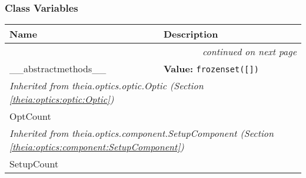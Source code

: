   \subsubsection{Class Variables}

    \vspace{-1cm}
\hspace{\varindent}\begin{longtable}{|p{\varnamewidth}|p{\vardescrwidth}|l}
\cline{1-2}
\cline{1-2} \centering \textbf{Name} & \centering \textbf{Description}& \\
\cline{1-2}
\endhead\cline{1-2}\multicolumn{3}{r}{\small\textit{continued on next page}}\\\endfoot\cline{1-2}
\endlastfoot\raggedright \_\-\_\-a\-b\-s\-t\-r\-a\-c\-t\-m\-e\-t\-h\-o\-d\-s\-\_\-\_\- & \raggedright \textbf{Value:} 
{\tt \texttt{frozenset([}\texttt{])}}&\\
\cline{1-2}
\multicolumn{2}{|l|}{\textit{Inherited from theia.optics.optic.Optic \textit{(Section \ref{theia:optics:optic:Optic})}}}\\
\multicolumn{2}{|p{\varwidth}|}{\raggedright OptCount}\\
\cline{1-2}
\multicolumn{2}{|l|}{\textit{Inherited from theia.optics.component.SetupComponent \textit{(Section \ref{theia:optics:component:SetupComponent})}}}\\
\multicolumn{2}{|p{\varwidth}|}{\raggedright SetupCount}\\
\cline{1-2}
\end{longtable}

